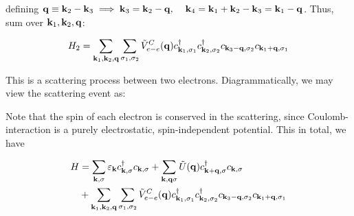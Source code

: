 defining $\vb{q} \equiv \vb{k}_2- \vb{k}_3 \implies \vb{k}_3 =  \vb{k}_2-\vb{q}, \hspace{0.4cm} \vb{k}_4 = \vb{k}_1 + \vb{k}_2-\vb{k}_3 = \vb{k}_1- \vb{q}$.
Thus, sum over $\vb{k}_1, \vb{k}_2, \vb{q}$:

\begin{align*}
H_2 = \sum_{\vb{k}_1,\vb{k}_2,\vb{q} } \sum_{\sigma_1, \sigma_2} \tilde{V}_{e-e}^C (\vb{q}) c^{\dagger}_{ \vb{k}_1, \sigma_1} c^{\dagger}_{ \vb{k}_2, \sigma_2}  c_{ \vb{k}_3-\vb{q}, \sigma_2} c_{ \vb{k}_1+\vb{q}, \sigma_1}
\end{align*}

\noindent This is a scattering process between two electrons. 
\noindent Diagrammatically, we may view the scattering event as: 

 
\begin{center}
\end{center}

\noindent Note that the spin of each electron is conserved in the scattering, since Coulomb-interaction is a purely electrostatic, spin-independent potential. This in total, we have

\begin{align*}
	H &= \sum_{\vb{k}, \sigma} \varepsilon_{\vb{k}} c^{\dagger}_{ \vb{k}, \sigma} c_{\vb{k}, \sigma} +  \sum_{\vb{k}, \vb{q} \sigma} \tilde{U}(\vb{q}) c^{\dagger}_{ \vb{k}+\vb{q}, \sigma}c_{\vb{k}, \sigma}\\
	& +  \sum_{\vb{k}_1,\vb{k}_2,\vb{q} } \sum_{\sigma_1, \sigma_2} \tilde{V}_{e-e}^C (\vb{q}) c^{\dagger}_{ \vb{k}_1, \sigma_1} c^{\dagger}_{ \vb{k}_2, \sigma_2}  c_{ \vb{k}_3-\vb{q}, \sigma_2} c_{ \vb{k}_1+\vb{q}, \sigma_1}
\end{align*}

